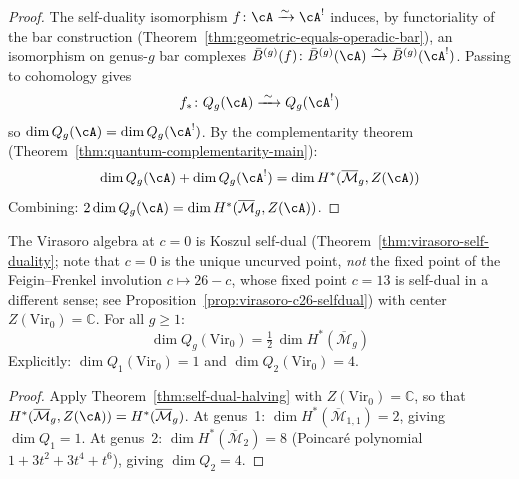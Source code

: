\begin{proof}
The self-duality isomorphism $f\colon \cA \xrightarrow{\sim} \cA^!$ induces,
by functoriality of the bar construction
(Theorem~\ref{thm:geometric-equals-operadic-bar}), an isomorphism on
genus-$g$ bar complexes $\bar{B}^{(g)}(f)\colon \bar{B}^{(g)}(\cA)
\xrightarrow{\sim} \bar{B}^{(g)}(\cA^!)$.  Passing to cohomology gives
\begin{equation}\label{eq:self-dual-qg-iso}
f_*\colon Q_g(\cA) \xrightarrow{\;\sim\;} Q_g(\cA^!)
\end{equation}
so $\dim Q_g(\cA) = \dim Q_g(\cA^!)$.  By the complementarity theorem
(Theorem~\ref{thm:quantum-complementarity-main}):
\[
\dim Q_g(\cA) + \dim Q_g(\cA^!)
= \dim H^*(\overline{\mathcal{M}}_g, Z(\cA))
\]
Combining: $2\dim Q_g(\cA) =
\dim H^*(\overline{\mathcal{M}}_g, Z(\cA))$.
\end{proof}

\begin{corollary}
\label{cor:virasoro-quantum-dim}
The Virasoro algebra at $c = 0$ is Koszul self-dual
(Theorem~\ref{thm:virasoro-self-duality}; note that $c = 0$ is the unique uncurved point, \emph{not} the fixed point of the Feigin--Frenkel involution $c \mapsto 26 - c$, whose fixed point $c = 13$ is self-dual in a different sense; see Proposition~\ref{prop:virasoro-c26-selfdual}) with center $Z(\mathrm{Vir}_0)
= \mathbb{C}$.  For all $g \geq 1$:
\begin{equation}\label{eq:virasoro-quantum-dim}
\dim Q_g(\mathrm{Vir}_0)
= \tfrac{1}{2}\,\dim H^*(\overline{\mathcal{M}}_g)
\end{equation}
Explicitly: $\dim Q_1(\mathrm{Vir}_0) = 1$ and
$\dim Q_2(\mathrm{Vir}_0) = 4$.
\end{corollary}

\begin{proof}
Apply Theorem~\ref{thm:self-dual-halving} with
$Z(\mathrm{Vir}_0) = \mathbb{C}$, so that
$H^*(\overline{\mathcal{M}}_g, Z(\cA))
= H^*(\overline{\mathcal{M}}_g)$.
At genus~1: $\dim H^*(\overline{\mathcal{M}}_{1,1}) = 2$,
giving $\dim Q_1 = 1$.  At genus~2:
$\dim H^*(\overline{\mathcal{M}}_2) = 8$
(Poincar\'e polynomial $1 + 3t^2 + 3t^4 + t^6$),
giving $\dim Q_2 = 4$.
\end{proof}

